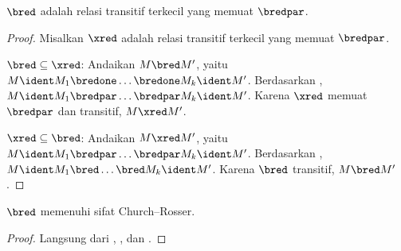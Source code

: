 \documentclass[../../../include/open-logic-section]{subfiles}
\begin{document}
\begin{lem}
  $\bred$ adalah relasi transitif terkecil yang memuat $\bredpar$.
\end{lem}

\begin{proof}
  Misalkan $\xred$ adalah relasi transitif terkecil yang memuat $\bredpar$.

  $\bred \subseteq \xred$: Andaikan $M \bred M'$, yaitu
  $M\ident M_1\bredone\dots\bredone M_k\ident M'$. Berdasarkan
  , $M\ident M_1\bredpar\dots\bredpar M_k\ident M'$.
  Karena $\xred$ memuat $\bredpar$ dan transitif, $M\xred M'$.

  $\xred \subseteq \bred$: Andaikan $M \xred M'$, yaitu
  $M\ident M_1\bredpar\dots\bredpar M_k\ident M'$. Berdasarkan
  , $M\ident M_1\bred\dots\bred M_k\ident M'$. Karena
  $\bred$ transitif, $M\bred M'$.
\end{proof}

\begin{thm}
  $\bred$ memenuhi sifat Church--Rosser.
\end{thm}

\begin{proof}
  Langsung dari , , dan
  .
\end{proof}
\end{document}
